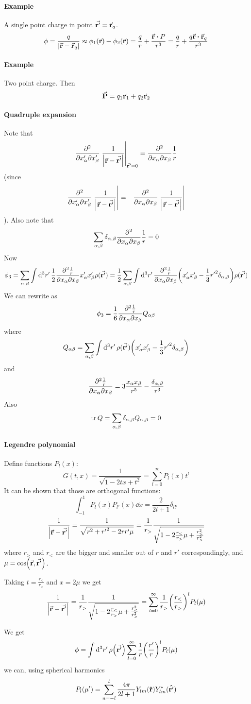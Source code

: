 \paragraph{Example}
A single point charge in point $\va{r'} = \va{r}_q$.
$$\phi = \frac{q}{\qty|\va{r} - \va{r}_q|} \approx \phi_1\qty(\va{r}) + \phi_2\qty(\va{r}) = \frac{q}{r} + \frac{\va{r} \vdot P}{r^3} = \frac{q}{r}+ \frac{q \va{r} \vdot \va{r}_q}{r^3}$$
\paragraph{Example}
Two point charge. Then
$$\va{P} = q_1 \va{r}_1 + q_2 \va{r}_2$$
\paragraph{Quadruple expansion}
Note that
$$\pdv{}{x'_\alpha}{x'_\beta} \eval{\frac{1}{\qty|\va{r} - \va{r'}|}}_{\va{r'}=0} = \pdv{}{x_\alpha}{x_\beta} \frac{1}{r}$$
(since $$\pdv{}{x'_\alpha}{x'_\beta} \eval{\frac{1}{\qty|\va{r} - \va{r'}|}} = - \pdv{}{x_\alpha}{x_\beta} \eval{\frac{1}{\qty|\va{r} - \va{r'}|}}$$).
Also note that
$$\sum_{\alpha, \beta} \delta_{\alpha, \beta} \pdv{}{x_\alpha}{x_\beta} \frac{1}{r} = 0$$
Now
$$\phi_3 = \sum_{\alpha, \beta}\int \dd[3]{r'} \frac{1}{2} \pdv{\frac{1}{r}}{x_\alpha}{x_\beta} x'_\alpha x'_\beta \rho(\va{r'}) = \frac{1}{2} \sum_{\alpha, \beta} \int \dd[3]{r'} \pdv{\frac{1}{r}}{x_\alpha}{x_\beta} \qty( x'_\alpha x'_\beta - \frac{1}{3} {r'}^2 \delta_{\alpha, \beta}) \rho(\va{r'}) $$
We can rewrite as
$$\phi_3  = \frac{1}{6} \pdv{\frac{1}{r}}{x_\alpha}{x_\beta} Q_{\alpha \beta}$$
where
$$Q_{\alpha \beta}= \sum_{\alpha, \beta} \int \dd[3]{r'} \rho(\va{r'}) \qty( x'_\alpha x'_\beta - \frac{1}{3} {r'}^2 \delta_{\alpha, \beta})   $$
and
$$\pdv{\frac{1}{r}}{x_\alpha}{x_\beta} = 3 \frac{x_\alpha x_\beta}{r^5} - \frac{\delta_{\alpha, \beta}}{r^3}$$
Also
$$\tr Q = \sum_{\alpha, \beta} \delta_{\alpha, \beta} Q_{\alpha, \beta} = 0$$
\paragraph{Legendre polynomial}
Define functions $P_l(x)$:
$$G(t,x) = \frac{1}{\sqrt{1-2tx +t^2}} = \sum_{l=0}^\infty P_l(x) t^l$$
It can be shown that those are orthogonal functions:
$$\int_{-1}^1 P_l(x) P_{l'}(x) \dd{x} = \frac{2}{2l+1} \delta_{ll'}$$
$$\frac{1}{\qty|\va{r} - \va{r'}|} = \frac{1}{\sqrt{r^2+{r'}^2 -2rr'\mu }} = \frac{1}{r_>} \frac{1}{\sqrt{1-2\frac{r_<}{r_>} \mu + \frac{r_<^2}{r_>^2}}} $$
where $r_>$ and $r_<$ are the bigger and smaller out of $r$ and $r'$ correspondingly, and $\mu = \cos(\va{r}, \va{r'})$.

Taking $t=\frac{r_<}{r_>}$ and $x=2\mu$ we get
$$\frac{1}{\qty|\va{r} - \va{r'}|} = \frac{1}{r_>} \frac{1}{\sqrt{1-2\frac{r_<}{r_>} \mu + \frac{r_<^2}{r_>^2}}}  = \sum_{l=0}^\infty \frac{1}{r_>}\qty(\frac{r_<}{r_>})^l P_l(\mu)$$

We get
$$\phi = \int \dd[3]{r'} \rho\qty(\va{r'}) \sum_{l=0}^\infty \frac{1}{r} \qty(\frac{r'}{r})^l P_l(\mu) $$
we can, using spherical harmonics
$$P_l(\mu') = \sum_{n=-l}^l \frac{4\pi}{2l+1} Y_{lm}(\vu{r})Y^*_{lm}(\vu{r'})$$
